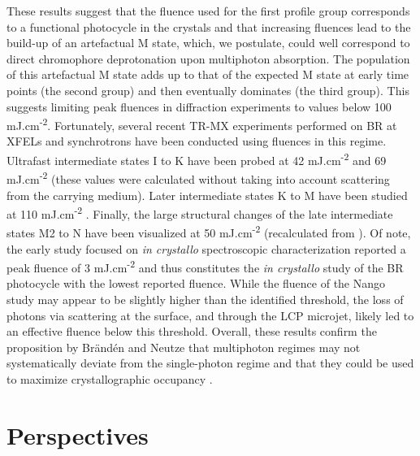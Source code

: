 These results suggest that the fluence used for the first profile group corresponds to a functional photocycle in the crystals and that increasing fluences lead to the build-up of an artefactual M state, which, we postulate, could well correspond to direct chromophore deprotonation upon multiphoton absorption. The population of this artefactual M state adds up to that of the expected M state at early time points (the second group) and then eventually dominates (the third group). This suggests limiting peak fluences in diffraction experiments to values below 100 mJ.cm\textsuperscript{-2}. Fortunately, several recent TR-MX experiments performed on BR at XFELs and synchrotrons have been conducted using fluences in this regime. Ultrafast intermediate states I to K have been probed at 42 mJ.cm\textsuperscript{-2} \parencite{noglyRetinalIsomerizationBacteriorhodopsin2018} and 69 mJ.cm\textsuperscript{-2} \parencite{nasskovacsThreedimensionalViewUltrafast2019} (these values were calculated without taking into account scattering from the carrying medium). Later intermediate states K to M have been studied at 110 mJ.cm\textsuperscript{-2} \parencite{nangoThreedimensionalMovieStructural2016}. Finally, the large structural changes of the late intermediate states M2 to N have been visualized at 50 mJ.cm\textsuperscript{-2} (recalculated from \cite{weinertProtonUptakeMechanism2019}). Of note, the early study focused on \textit{in crystallo} spectroscopic characterization \parencite{efremovTimeResolvedMicrospectroscopySingle2006} reported a peak fluence of 3 mJ.cm\textsuperscript{-2} and thus constitutes the \textit{in crystallo} study of the BR photocycle with the lowest reported fluence.  While the fluence of the Nango study may appear to be slightly higher than the identified threshold, the loss of photons via scattering at the surface, and through the LCP microjet, likely led to an effective fluence below this threshold. Overall, these results confirm the proposition by Brändén and Neutze that multiphoton regimes may not systematically deviate from the single-photon regime and that they could be used to maximize crystallographic occupancy \parencite{brandenAdvancesChallengesTimeresolved2021}.

\section{Perspectives}

